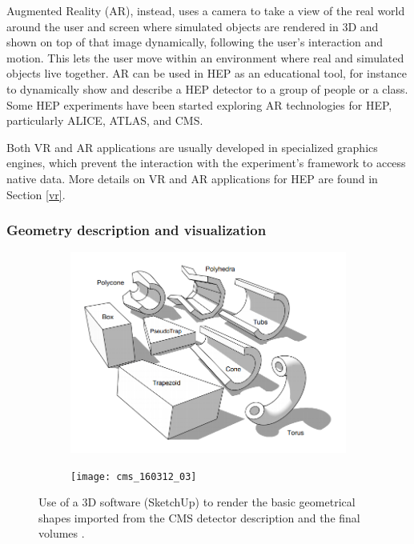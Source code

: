 \documentclass[12pt,a4paper]{article}
\begin{document}
Augmented Reality (AR), instead, uses a camera to take a view of the real world around the user and screen where simulated
objects are rendered in 3D and shown on top of that image dynamically, following the user's interaction and motion.
This lets the user move within an environment where real and simulated objects live together. AR can be used in HEP as
an educational tool, for instance to dynamically show and describe a HEP detector to a group of people or a class.
Some HEP experiments have been started exploring AR technologies for HEP, particularly ALICE, ATLAS, and CMS.

Both VR and AR applications are usually developed in specialized graphics engines, which prevent the interaction
with the experiment's framework to access native data. More details on VR and AR applications for HEP are found in Section \ref{vr}.


\hypertarget{geometry-description}{%
\subsubsection{Geometry description and visualization}\label{geometry-description}}


\begin{figure}
	\centering
	\begin{subfigure}[b]{0.475\textwidth}
		\centering
		\includegraphics[width=\textwidth]{cms-sketchup-shapes}
		\caption[Converting the CMS detector geometry data to 3D meshes]{{\small}}
		\label{fig:ed-sketchup-a}
	\end{subfigure}
	\quad
	\begin{subfigure}[b]{0.475\textwidth}
		\centering
		\texttt{[image: cms\_160312\_03]}
		\caption[Rendering the CMS geometry in the SketchUp 3D software]%
		{{\small }}
		\label{fig:cms-sketchup-b}
	\end{subfigure}
	\caption[Using 3D editing software for HEP Geometry]
	{\small Use of a 3D software (SketchUp) to render the basic geometrical shapes imported from the CMS detector description and the final volumes \cite{CMSSketchUpImages}.}
	\label{fig:cms-sketchup}
\end{figure}
\end{document}
